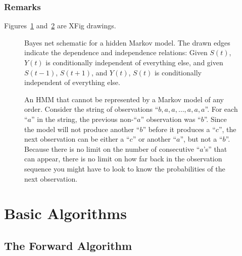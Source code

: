 \documentclass[prelim,showlabels]{book}
\newcommand{\ti}[2]{{#1}{(#2)}}                  %
\begin{document}
\subsection{Remarks}
\label{sec:DHMMRemarks}

Figures~\ref{fig:dhmm_net} and~\ref{fig:nonmm} are XFig drawings.
\begin{figure}[htbp]
  \centering{
  }
  \caption[Bayes net schematic for a hidden Markov model.]%
  {Bayes net schematic for a hidden Markov model.  The drawn edges
    indicate the dependence and independence relations: Given
    $\ti{S}{t}$, $\ti{Y}{t}$ is conditionally independent of
    everything else, and given $\ti{S}{t-1}$, $\ti{S}{t+1}$, and
    $\ti{Y}{t}$, $\ti{S}{t}$ is conditionally independent of
    everything else.}
  \label{fig:dhmm_net}
\end{figure}

\begin{figure}[htbp]
  \centering{
  }
  \caption[An HMM that cannot be represented by a
  Markov model.]%
  {An HMM that cannot be represented by a Markov model of any order.
    Consider the string of observations ``$b,a,a,\ldots,a,a,a$''.  For
    each ``$a$'' in the string, the previous non-``$a$'' observation
    was ``$b$''.  Since the model will not produce another ``$b$'' before
    it produces a ``$c$'', the next observation can be either a
    ``$c$'' or another ``$a$'', but not a ``$b$''.  Because there is
    no limit on the number of consecutive ``$a$'s'' that can appear,
    there is no limit on how far back in the observation sequence you
    might have to look to know the probabilities of the next
    observation.}
  \label{fig:nonmm}
\end{figure}

\chapter{Basic Algorithms}
\label{chap:algorithms}

\section{The Forward Algorithm}
\label{sec:forward}
\end{document}
